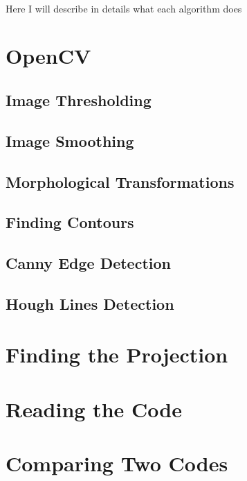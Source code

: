 \paragraph{}
Here I will describe in details what each algorithm does
\section{OpenCV}
\subsection{Image Thresholding}
\subsection{Image Smoothing}
\subsection{Morphological Transformations}
\subsection{Finding Contours}
\subsection{Canny Edge Detection}
\subsection{Hough Lines Detection}

\section{Finding the Projection}

\section{Reading the Code}

\section{Comparing Two Codes}